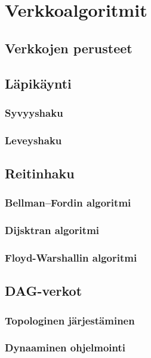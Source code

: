 \chapter{Verkkoalgoritmit}

\section{Verkkojen perusteet}

\section{Läpikäynti}

\subsection{Syvyyshaku}

\subsection{Leveyshaku}

\section{Reitinhaku}

\subsection{Bellman–Fordin algoritmi}

\subsection{Dijsktran algoritmi}

\subsection{Floyd-Warshallin algoritmi}

\section{DAG-verkot}

\subsection{Topologinen järjestäminen}

\subsection{Dynaaminen ohjelmointi}


